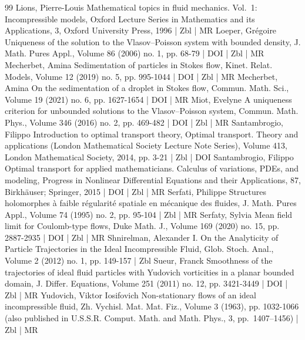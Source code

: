 \begin{thebibliography}{99}
 Lions, Pierre-Louis Mathematical topics in fluid mechanics. Vol. 1: Incompressible models, Oxford Lecture Series in Mathematics and its Applications, 3, Oxford University Press, 1996 | Zbl | MR
 Loeper, Grégoire Uniqueness of the solution to the Vlasov–Poisson system with bounded density, J. Math. Pures Appl., Volume 86 (2006) no. 1, pp. 68-79 | DOI | Zbl | MR
 Mecherbet, Amina Sedimentation of particles in Stokes flow, Kinet. Relat. Models, Volume 12 (2019) no. 5, pp. 995-1044 | DOI | Zbl | MR
 Mecherbet, Amina On the sedimentation of a droplet in Stokes flow, Commun. Math. Sci., Volume 19 (2021) no. 6, pp. 1627-1654 | DOI | MR
 Miot, Evelyne A uniqueness criterion for unbounded solutions to the Vlasov–Poisson system, Commun. Math. Phys., Volume 346 (2016) no. 2, pp. 469-482 | DOI | Zbl | MR
 Santambrogio, Filippo Introduction to optimal transport theory, Optimal transport. Theory and applications (London Mathematical Society Lecture Note Series), Volume 413, London Mathematical Society, 2014, pp. 3-21 | Zbl | DOI
 Santambrogio, Filippo Optimal transport for applied mathematicians. Calculus of variations, PDEs, and modeling, Progress in Nonlinear Differential Equations and their Applications, 87, Birkhäuser; Springer, 2015 | DOI | Zbl | MR
 Serfati, Philippe Structures holomorphes à faible régularité spatiale en mécanique des fluides, J. Math. Pures Appl., Volume 74 (1995) no. 2, pp. 95-104 | Zbl | MR
 Serfaty, Sylvia Mean field limit for Coulomb-type flows, Duke Math. J., Volume 169 (2020) no. 15, pp. 2887-2935 | DOI | Zbl | MR
 Shnirelman, Alexander I. On the Analyticity of Particle Trajectories in the Ideal Incompressible Fluid, Glob. Stoch. Anal., Volume 2 (2012) no. 1, pp. 149-157 | Zbl
 Sueur, Franck Smoothness of the trajectories of ideal fluid particles with Yudovich vorticities in a planar bounded domain, J. Differ. Equations, Volume 251 (2011) no. 12, pp. 3421-3449 | DOI | Zbl | MR
 Yudovich, Viktor Iosifovich Non-stationary flows of an ideal incompressible fluid, Zh. Vychisl. Mat. Mat. Fiz., Volume 3 (1963), pp. 1032-1066 (also published in U.S.S.R. Comput. Math. and Math. Phys., 3, pp. 1407–1456) | Zbl | MR
\end{thebibliography}
